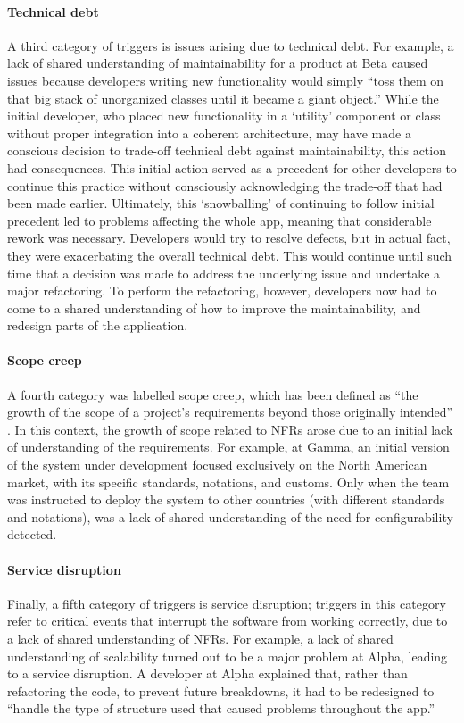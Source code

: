\documentclass[smallextended]{svjour3}
\begin{document}
\paragraph{Technical debt} A third category of triggers is issues arising due to technical debt. For example, a lack of shared understanding of maintainability for a product at Beta caused issues because developers writing new functionality would simply ``toss them on that big stack of unorganized classes until it became a giant object.'' While the initial developer, who placed new functionality in a `utility' component or class without proper integration into a coherent architecture, may have made a conscious decision to trade-off technical debt against maintainability,  this action had consequences. This initial action served as a precedent for other developers to continue this practice without consciously acknowledging the trade-off that had been made earlier. 
Ultimately, this `snowballing' of continuing to follow initial precedent led to problems affecting the whole app,
meaning that considerable rework was necessary. Developers would try to resolve defects, but in actual fact, they were exacerbating the overall technical debt. This would continue until such time that a decision was made to address the underlying issue and undertake a major refactoring. To perform the refactoring, however, developers now had to come to a shared understanding of how to improve the maintainability, and redesign parts of the application. 

\paragraph{Scope creep} A fourth category was labelled scope creep, which has been defined as ``the growth of the scope of a project's requirements beyond those originally intended'' \citep{williams2009exploring}. In this context, the growth of scope related to NFRs arose due to an initial lack of understanding of the requirements. For example, at Gamma, an initial version of the system under development focused exclusively on the North American market, with its specific standards, notations, and customs. Only when the team was instructed to deploy the system to other countries (with different standards and notations), was a lack of shared understanding of the need for configurability detected. 

\paragraph{Service disruption} Finally, a fifth category of triggers is service disruption; triggers in this category refer to critical events that interrupt the software from working correctly, due to a lack of shared understanding of NFRs. For example, a lack of shared understanding of scalability turned out to be a major problem at Alpha, leading to a service disruption. A developer at Alpha explained that, rather than refactoring the code, to prevent future breakdowns, it had to be redesigned to \textmd{``handle the type of structure used that caused problems throughout the app.''}
\end{document}
